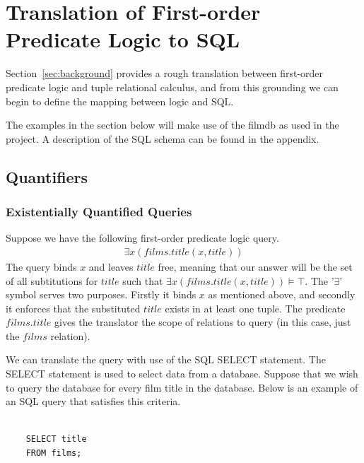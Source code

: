 \documentclass[a4paper, 11pt]{article}
\begin{document}
  \section{Translation of First-order Predicate Logic to SQL}

    Section~\ref{sec:background} provides a rough translation between
    first-order predicate logic and tuple relational calculus, and from this
    grounding we can begin to define the mapping between logic and SQL.

    The examples in the section below will make use of the filmdb as used in
    the project. A description of the SQL schema can be found in the appendix.

    \subsection{Quantifiers}

    \subsubsection{Existentially Quantified Queries}

    Suppose we have the following first-order predicate logic query.
    \begin{gather}
      \exists x(films.title(x, title)) \label{select1}
    \end{gather}
    The query binds $x$ and leaves $title$ free, meaning that our
    answer will be the set of all subtitutions for $title$ such that
    $\exists x(films.title(x, title)) \models \top$. The '$\exists$' symbol
    serves two purposes. Firstly it binds $x$ as mentioned above, and secondly
    it enforces that the substituted $title$ exists in at least one tuple.
    The predicate $films.title$ gives the translator the scope of
    relations to query (in this case, just the $films$ relation).

    We can translate the query with use of the SQL SELECT statement. The SELECT
    statement is used to select data from a database.\cite{w3SELECT} Suppose
    that we wish to query the database for every film title in the database.
    Below is an example of an SQL query that satisfies this criteria.

    \begin{verbatim}

    SELECT title
    FROM films;

    \end{verbatim}
\end{document}
